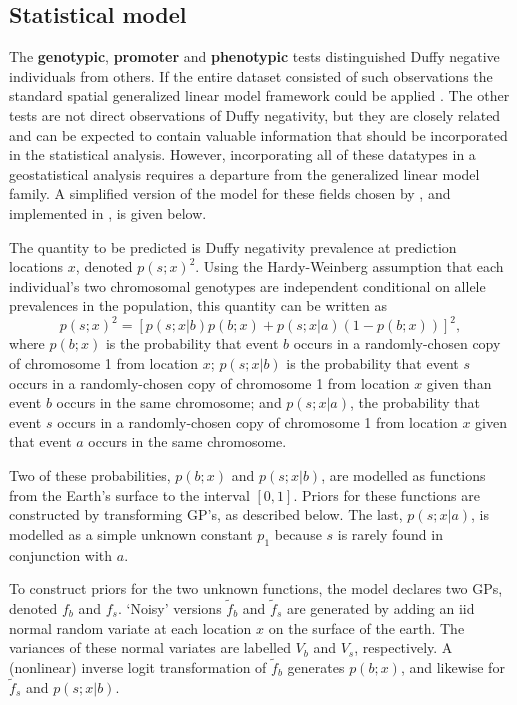 \documentclass[article]{jss}
\begin{document}
\subsection{Statistical model}
The \textbf{genotypic}, \textbf{promoter} and \textbf{phenotypic} tests distinguished Duffy negative individuals from others. If the entire dataset consisted of such observations the standard spatial generalized linear model framework could be applied \citep{diggle}. The other tests are not direct observations of Duffy negativity, but they are closely related and can be expected to contain valuable information that should be incorporated in the statistical analysis. However, incorporating all of these datatypes in a geostatistical analysis requires a departure from the generalized linear model family. A simplified version of the model for these fields chosen by \cite{Howes}, and implemented in , is given below. 

The quantity to be predicted is Duffy negativity prevalence at prediction locations $x$, denoted $p(s;x)^2$. Using the Hardy-Weinberg assumption \cite{gillespie} that each individual's two chromosomal genotypes are independent conditional on allele prevalences in the population, this quantity can be written as
\begin{equation}
    \label{eq:duffy-formula} 
    p(s;x)^2=\left[p(s;x|b)p(b;x)+p(s;x|a)(1-p(b;x))\right]^2,
\end{equation}
where $p(b;x)$ is the probability that event $b$ occurs in a randomly-chosen copy of chromosome 1 from location $x$; $p(s;x|b)$ is the probability that event $s$ occurs in a randomly-chosen copy of chromosome 1 from location $x$ given than event $b$ occurs in the same chromosome; and $p(s;x|a)$, the probability that event $s$ occurs in a randomly-chosen copy of chromosome 1 from location $x$ given that event $a$ occurs in the same chromosome. 

Two of these probabilities, $p(b;x)$ and $p(s;x|b)$, are modelled as functions from the Earth's surface to the interval $[0,1]$. Priors for these functions are constructed by transforming GP's, as described below. The last, $p(s;x|a)$, is modelled as a simple unknown constant $p_1$ because $s$ is rarely found in conjunction with $a$.

To construct priors for the two unknown functions, the model declares two GPs, denoted $f_b$ and $f_s$. `Noisy' versions $\tilde f_b$ and $\tilde f_s$ are generated by adding an iid normal random variate at each location $x$ on the surface of the earth. The variances of these normal variates are labelled $V_b$ and $V_s$, respectively. A (nonlinear) inverse logit transformation of $\tilde f_b$ generates $p(b;x)$, and likewise for $\tilde f_s$ and $p(s;x|b)$.
\end{document}
